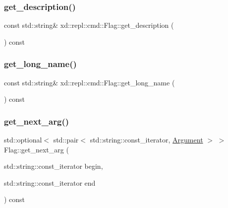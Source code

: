 \subsubsection{\texorpdfstring{get\+\_\+description()}{get\_description()}}
{\footnotesize\ttfamily const std\+::string\& xd\+::repl\+::cmd\+::\+Flag\+::get\+\_\+description (\begin{DoxyParamCaption}{ }\end{DoxyParamCaption}) const\hspace{0.3cm}{\ttfamily [inline]}}

\mbox{\label{classxd_1_1repl_1_1cmd_1_1_flag_afa6703e9c82dc5b5e1fa436aec9e1af2}} 
\subsubsection{\texorpdfstring{get\+\_\+long\+\_\+name()}{get\_long\_name()}}
{\footnotesize\ttfamily const std\+::string\& xd\+::repl\+::cmd\+::\+Flag\+::get\+\_\+long\+\_\+name (\begin{DoxyParamCaption}{ }\end{DoxyParamCaption}) const\hspace{0.3cm}{\ttfamily [inline]}}

\mbox{\label{classxd_1_1repl_1_1cmd_1_1_flag_a247cb739b67d5de6caf5a836a56184c0}} 
\subsubsection{\texorpdfstring{get\+\_\+next\+\_\+arg()}{get\_next\_arg()}}
{\footnotesize\ttfamily std\+::optional$<$ std\+::pair$<$ std\+::string\+::const\+\_\+iterator, \mbox{\hyperlink{classxd_1_1repl_1_1cmd_1_1_argument}{Argument}} $>$ $>$ Flag\+::get\+\_\+next\+\_\+arg (\begin{DoxyParamCaption}\item[{std\+::string\+::const\+\_\+iterator}]{begin,  }\item[{std\+::string\+::const\+\_\+iterator}]{end }\end{DoxyParamCaption}) const}

